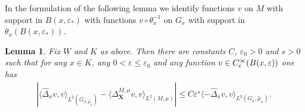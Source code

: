 \documentclass[10pt]{amsart}
\newcommand{\rc}{\textup{c}}
\newcommand{\bX}{{\boldsymbol{X}}}
\newtheorem{lemma}[theorem]{Lemma}
\theoremstyle{definition}
\let\epsilon\varepsilon
\let\Xb\bX
\newcommand{\1}{\mathbbm{1}}
\begin{document}
In the formulation of the following lemma we identify functions $v$ on $M$ with support in $B(x,\epsilon_*)$ with functions $v\circ\theta_x^{-1}$ on $G_{x}$ with support in $\theta_x(B(x,\epsilon_*))$.

\begin{lemma}\label{l:remainder2}
Fix $W$ and $K$ as above. Then there are constants $C$, $\epsilon_0>0$ and $s>0$ such that for any $x\in K$, any $0<\epsilon\leq\epsilon_0$ and any function $v\in C^\infty_\rc(B(x,\epsilon))$ one has
\begin{align*}
\left| \langle \widehat{\Delta}_{x} v, v \rangle_{L^2(G_{x,\widehat\mu_{x}})} - \langle \Delta_\Xb^{M,\mu} v, v \rangle_{L^2(M,\mu)}\right| \leq C \epsilon^s \langle - \widehat{\Delta}_{x} v, v \rangle_{L^2(G_{x},\widehat\mu_{x})}.
\end{align*}
\end{lemma}
\end{document}
